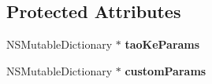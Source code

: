 \subsection*{Protected Attributes}
\begin{DoxyCompactItemize}
\item 
\mbox{\label{category_featured_view_controller_07_08_a255bd855717d4cc17059f3aa3c49a65c}} 
N\+S\+Mutable\+Dictionary $\ast$ {\bfseries tao\+Ke\+Params}
\item 
\mbox{\label{category_featured_view_controller_07_08_a3ba8f54876e5b8c86002bb3d3d4f1892}} 
N\+S\+Mutable\+Dictionary $\ast$ {\bfseries custom\+Params}
\end{DoxyCompactItemize}
